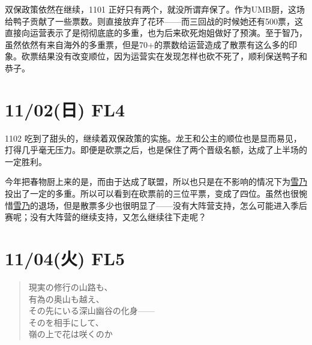 双保政策依然在继续，1101 正好只有两个，就没所谓弃保了。作为UMB厨，这场给鸭子贡献了一些票数。则直接放弃了花环——而三回战的时候她还有500票，这直接向运营表示了是彻彻底底的多重，也为后来砍死炮姐做好了预演。至于智乃，虽然依然有来自海外的多重票，但是70+的票数给运营造成了散票有这么多的印象。砍票结果没有改变顺位，因为运营实在发现怎样也砍不死了，顺利保送鸭子和恭子。

\section{11/02(日) FL4}


1102 吃到了甜头的，继续着双保政策的实施。龙王和公主的顺位也是显而易见，打得几乎毫无压力。即便是砍票之后，也是保住了两个晋级名额，达成了上半场的一定胜利。

今年把春物厨上来的是，而由于达成了联盟，所以也只是在不影响的情况下为\uline{雪乃}投出了一定的多重。所以可以看到在砍票前的三位平票，变成了四位。虽然也很惋惜\uline{雪乃}的退场，但是散票多少也很明显了——没有大阵营支持，怎么可能进入季后赛呢；没有大阵营的继续支持，又怎么继续往下走呢？

\section{11/04(火) FL5}

\begin{quote}\kasho
現実の修行の山路も、\\
有為の奥山も越え、\\
その先にいる深山幽谷の化身——\\
そのを相手にして、\\
嶺の上で花は咲くのか
\end{quote}

